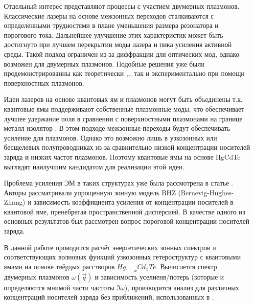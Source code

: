 \documentclass[../main.tex]{subfiles}
\begin{document}
Отдельный интерес представляют процессы с участием двумерных плазмонов. Классические лазеры на основе межзонных переходов сталкиваются с определенными трудностями
в плане уменьшения размера резонатора и порогового тока. Дальнейшее улучшение этих характеристик может быть достигнуто при лучшем перекрытии моды лазера
и пика усиления активной среды. Такой подход ограничен из-за диффракции для оптических мод, однако возможен для двумерных плазмонов. Подобные решения
уже были продемонстрированны как теоретически \cite{bergman2003surface},\cite{berini2012surface},\cite{oulton2009plasmon}, так и экспериментально 
\cite{khurgin2012practicality} при помощи поверхностных плазмонов.

Идеи лазеров на основе квантовых ям и плазмонов могут быть объединены \cite{kapralov2019feasibility} т.к. квантовые ямы поддерживают собственные 
плазмонные моды, что обеспечивает лучшее удержание поля в сравнении с поверхностными плазмонами на границе металл-изолятор \cite{stern1967polarizability}.
В этом подходе межзонные переходы будут обеспечивать усиление для плазмонов. Однако это возможно лишь в узкозонных или бесщелевых полупроводниках
из-за сравнительно низкой концентрации носителей заряда и низких частот плазмонов. Поэтому квантовые ямы на основе HgCdTe выглядят наилучшим кандидатом
для реализации этой идеи.

Проблема усиления ЭМ в таких структурах уже была рассмотрена в статье \cite{kapralov2019feasibility}. Авторы рассматривали упрощенную зонную модель
BHZ (Bernevig-Hughes-Zhang) \cite{bernevig2006quantum} и зависимость коэффициента усиления от концентрации носителей в квантовой яме, пренебрегая 
пространственной дисперсией. В качестве одного из основных результатов был рассмотрен вопрос пороговой концентрации носителей заряда.

В данной работе проводится расчёт энергетических зонных спектров и соответствующих волновых функций узкозонных гетероструктур с квантовыми
ямами на основе твёрдых расстворов $Hg_{1-x}Cd_{x}Te$. Вычислется спектр двумерных плазмонов $\omega(\vec q)$ и зависимость уселиеня/потерь
(которые и определяются мнимой части частоты $\Im \omega$), производится анализ для различных концентраций носителей заряда без приближений, 
использованных в \cite{kapralov2019feasibility}.
\end{document}
